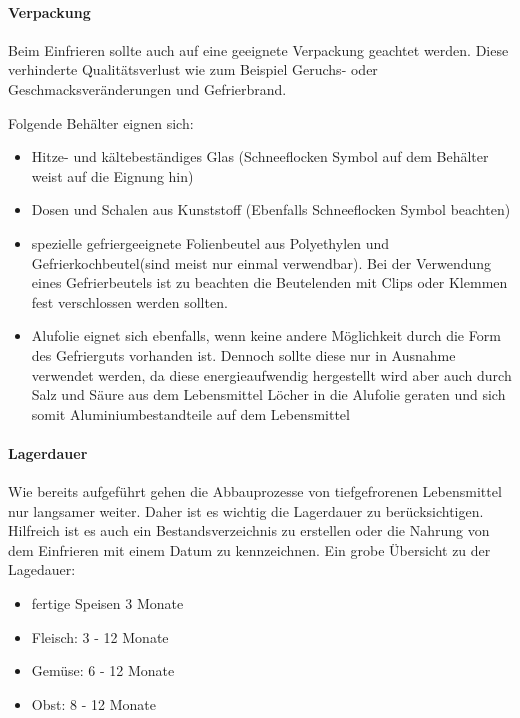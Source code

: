 \paragraph{Verpackung}
Beim Einfrieren sollte auch auf eine geeignete Verpackung geachtet werden. Diese verhinderte Qualitätsverlust wie zum Beispiel Geruchs- oder Geschmacksveränderungen und Gefrierbrand.

Folgende Behälter eignen sich:
\begin{itemize}
  \item Hitze- und kältebeständiges Glas (Schneeflocken Symbol auf dem Behälter weist auf die Eignung hin)

  \item Dosen und Schalen aus Kunststoff (Ebenfalls Schneeflocken Symbol beachten)
  \item spezielle gefriergeeignete Folienbeutel aus Polyethylen und Gefrierkochbeutel(sind meist nur einmal verwendbar). Bei der Verwendung eines Gefrierbeutels ist zu beachten die Beutelenden mit Clips oder Klemmen fest verschlossen werden sollten.
  \item   Alufolie eignet sich ebenfalls, wenn keine andere Möglichkeit durch die Form des Gefrierguts vorhanden ist. Dennoch sollte diese nur in Ausnahme verwendet werden, da diese energieaufwendig hergestellt wird aber auch durch Salz und Säure aus dem Lebensmittel Löcher in die Alufolie geraten und sich somit Aluminiumbestandteile auf dem Lebensmittel 
\end{itemize} %




\paragraph{Lagerdauer}
Wie bereits aufgeführt gehen die Abbauprozesse von tiefgefrorenen Lebensmittel nur langsamer weiter. Daher ist es wichtig die Lagerdauer zu berücksichtigen. Hilfreich ist es auch ein Bestandsverzeichnis zu erstellen oder die Nahrung von dem Einfrieren mit einem Datum zu kennzeichnen. 
Ein grobe Übersicht zu der Lagedauer:
\begin{itemize}
  \item fertige Speisen 3 Monate
  \item Fleisch: 3 - 12 Monate
  \item Gemüse: 6 - 12 Monate
  \item Obst: 8 - 12 Monate
\end{itemize}

